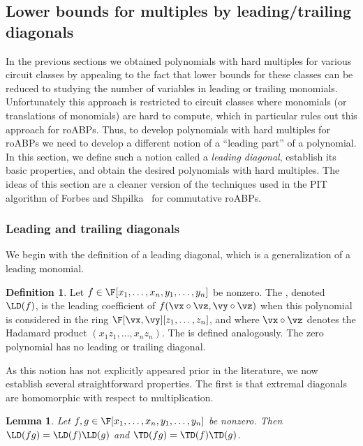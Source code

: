 \documentclass[11pt]{article}
\numberwithin{equation}{section}
\newtheorem{lemma}[theorem]{Lemma}
\theoremstyle{definition}
\newtheorem{definition}[theorem]{Definition}
\theoremstyle{plain}
\begin{document}
\subsection{Lower bounds for multiples by leading/trailing diagonals}

In the previous sections we obtained polynomials with hard multiples for various circuit classes by appealing to the fact that lower bounds for these classes can be reduced to studying the number of variables in leading or trailing monomials.  Unfortunately this approach is restricted to circuit classes where monomials (or translations of monomials) are hard to compute, which in particular rules out this approach for roABPs.  Thus, to develop polynomials with hard multiples for roABPs we need to develop a different notion of a ``leading part'' of a polynomial.  In this section, we define such a notion called a \emph{leading diagonal}, establish its basic properties, and obtain the desired polynomials with hard multiples.  The ideas of this section are a cleaner version of the techniques used in the PIT algorithm of Forbes and Shpilka~\cite{ForbesShpilka12} for commutative roABPs.

\subsubsection{Leading and trailing diagonals}

We begin with the definition of a leading diagonal, which is a generalization of a leading monomial.

\begin{definition}
        Let $f\in\F[x_1,\ldots,x_n,y_1,\ldots,y_n]$ be nonzero.  The , denoted $\LD(f)$, is the leading coefficient of $f(\vx\circ\vz,\vy\circ\vz)$ when this polynomial is considered in the ring $\F[\vx,\vy][z_1,\ldots,z_n]$, and where $\vx\circ\vz$ denotes the Hadamard product $(x_1z_1,\ldots,x_nz_n)$.  The  is defined analogously. The zero polynomial has no leading or trailing diagonal.
\end{definition}

As this notion has not explicitly appeared prior in the literature, we now establish several straightforward properties. The first is that extremal diagonals are homomorphic with respect to multiplication.

\begin{lemma}\label{res:diagonals:mult-hom}
        Let $f,g\in\F[x_1,\ldots,x_n,y_1,\ldots,y_n]$ be nonzero.  Then $\LD(fg)=\LD(f)\LD(g)$ and $\TD(fg)=\TD(f)\TD(g)$.
\end{lemma}
\end{document}
